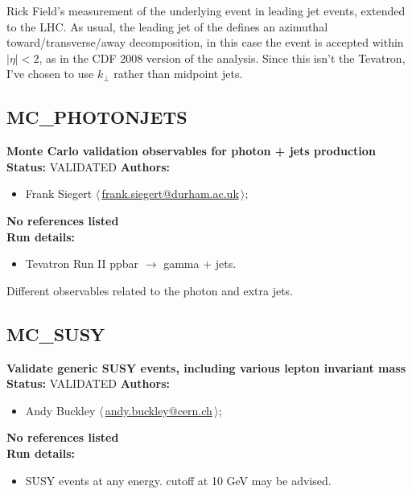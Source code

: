 \noindent Rick Field's measurement of the underlying event in leading jet events, extended to the LHC. As usual, the leading jet of the defines an azimuthal toward/transverse/away decomposition, in this case the event is accepted within $|\eta| < 2$, as in the CDF 2008 version of the analysis. Since this isn't the Tevatron, I've chosen to use $k_\perp$ rather than midpoint jets.

\clearpage


\clearpage

\subsection{MC\_PHOTONJETS}
\textbf{Monte Carlo validation observables for photon + jets production}\newline
\textbf{Status:} VALIDATED\newline
\textbf{Authors:}
\begin{itemize}
  \item Frank Siegert $\langle\,$\href{mailto:frank.siegert@durham.ac.uk}{frank.siegert@durham.ac.uk}$\,\rangle$;
\end{itemize}
\textbf{No references listed}\\ 
\textbf{Run details:}
\begin{itemize}

  \item Tevatron Run II ppbar \ensuremath{\to} gamma + jets.\end{itemize}

\noindent Different observables related to the photon and extra jets.

\clearpage


\clearpage

\subsection{MC\_SUSY}
\textbf{Validate generic SUSY events, including various lepton invariant mass}\newline
\textbf{Status:} VALIDATED\newline
\textbf{Authors:}
\begin{itemize}
  \item Andy Buckley $\langle\,$\href{mailto:andy.buckley@cern.ch}{andy.buckley@cern.ch}$\,\rangle$;
\end{itemize}
\textbf{No references listed}\\ 
\textbf{Run details:}
\begin{itemize}

  \item SUSY events at any energy. \pT cutoff at 10 GeV may be advised.\end{itemize}

